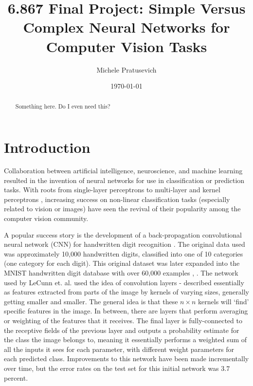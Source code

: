 \documentclass[10pt]{article}
\begin{document}
\title{6.867 Final Project: Simple Versus Complex Neural Networks for Computer Vision Tasks}
\author{Michele Pratusevich}
\date{\today}
\maketitle

\begin{abstract}
Something here. Do I even need this?
\end{abstract}

\section{Introduction}

Collaboration between artificial intelligence, neuroscience, and machine learning resulted in the invention of neural networks for use in classification or prediction tasks. With roots from single-layer perceptrons \cite{rosenblatt_perceptron:_1958} to multi-layer and kernel perceptrons \cite{aizerman_theoretical_1964}, increasing success on non-linear classification tasks (especially related to vision or images) have seen the revival of their popularity among the computer vision community. 

A popular success story is the development of a back-propagation convolutional neural network (CNN) for handwritten digit recognition \cite{lecun_handwritten_1990}. The original data used was approximately 10,000 handwritten digits, classified into one of 10 categories (one category for each digit). This original dataset was later expanded into the MNIST handwritten digit database with over 60,000 examples \cite{lecun_gradient-based_1998}, \cite{li_deng_mnist_2012}. The network used by LeCunn et. al. used the idea of convolution layers - described essentially as features extracted from parts of the image by kernels of varying sizes, generally getting smaller and smaller. The general idea is that these $n \times n$ kernels will `find' specific features in the image. In between, there are layers that perform averaging or weighting of the features that it receives. The final layer is fully-connected to the receptive fields of the previous layer and outputs a probability estimate for the class the image belongs to, meaning it essentially performs a weighted sum of all the inputs it sees for each parameter, with different weight parameters for each predicted class. Improvements to this network have been made incrementally over time, but the error rates on the test set for this initial network was $3.7$ percent. 
\end{document}
